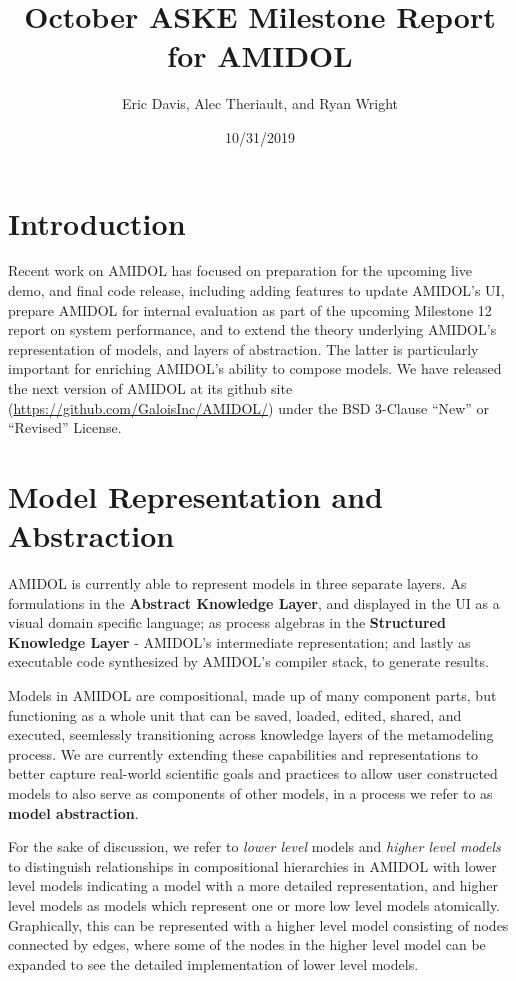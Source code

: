 \documentclass[12pt]{galois-whitepaper}
\author{Eric Davis, Alec Theriault, and Ryan Wright}
\title{October ASKE Milestone Report for AMIDOL}
\date{10/31/2019}
\begin{document}
\maketitle

\vspace*{2cm}
\tableofcontents

\section{Introduction}

Recent work on AMIDOL has focused on preparation for the upcoming live
demo, and final code release, including adding features to update
AMIDOL's UI, prepare AMIDOL for internal evaluation as part of the
upcoming Milestone 12 report on system performance, and to extend the
theory underlying AMIDOL's representation of models, and layers of
abstraction.  The latter is particularly important for enriching
AMIDOL's ability to compose models.  We have released the
next version of AMIDOL at its github site
(\url{https://github.com/GaloisInc/AMIDOL/}) under the BSD 3-Clause
``New'' or ``Revised'' License.

\section{Model Representation and Abstraction}

AMIDOL is currently able to represent models in three separate
layers.  As formulations in the \textbf{Abstract Knowledge Layer}, and
displayed in the UI as a visual domain specific language; as process
algebras in the \textbf{Structured Knowledge Layer} - AMIDOL's
intermediate representation; and lastly as executable code synthesized
by AMIDOL's compiler stack, to generate results.

Models in AMIDOL are compositional, made up of many component parts,
but functioning as a whole unit that can be saved, loaded, edited,
shared, and executed, seemlessly transitioning across knowledge layers
of the metamodeling process.  We are currently extending these
capabilities and representations to better capture real-world
scientific goals and practices to allow user constructed models to
also serve as components of other models, in a process we refer to as
\textbf{model abstraction}.

For the sake of discussion, we refer to \emph{lower level} models and
\emph{higher level models} to distinguish relationships in compositional
hierarchies in AMIDOL with lower level models indicating a model with
a more detailed representation, and higher level models as models
which represent one or more low level models atomically.  Graphically,
this can be represented with a higher level model consisting of nodes
connected by edges, where some of the nodes in the higher level model
can be expanded to see the detailed implementation of lower level models.
\end{document}
